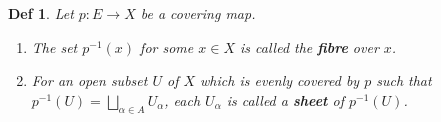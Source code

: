 \documentclass[paper=a4, fontsize=11pt]{scrartcl}
\newtheorem{definition}{Def}
\begin{document}
\vspace{0.15in}

\begin{definition}
	Let $p:E\to X $ be a covering map.
	\begin{enumerate}
		\item The set $p^{-1}(x)$ for some $x\in X$ is called the \textbf{fibre} over $x$.
		\item For an open subset $U$ of $X$ which is evenly covered by $p$ such that $p^{-1}(U)=\bigsqcup\limits_{\alpha \in A} U_\alpha$, each $U_\alpha$ is called a \textbf{sheet} of $p^{-1}(U)$.
	\end{enumerate}
\end{definition}
\end{document}
